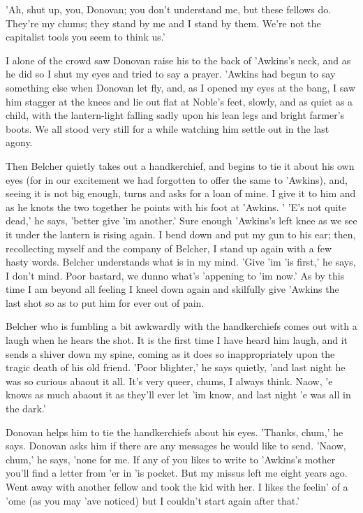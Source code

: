 \documentclass[10pt,a4paper]{article}
\newcommand{\glos}[3]{\dotuline{#1}\marginpar{\scriptsize\textit{#3} #2}}
\begin{document}
'Ah, shut up, you, Donovan; you don't understand me, but these fellows do. They're my chums; they stand by me and I stand by them. We're not the capitalist tools you seem to think us.' 

I alone of the crowd saw Donovan raise his \glos{Webley}{revolver mærke}{propr.} to the back of 'Awkins's neck, and as he did so I shut my eyes and tried to say a prayer. 'Awkins had begun to say something else when Donovan let fly, and, as I opened my eyes at the bang, I saw him stagger at the knees and lie out flat at Noble's feet, slowly, and as quiet as a child, with the lantern-light falling sadly upon his lean legs and bright farmer's boots. We all stood very still for a while watching him settle out in the last agony. 

Then Belcher quietly takes out a handkerchief, and begins to tie it about his own eyes (for in our excitement we had forgotten to offer the same to 'Awkins), and, seeing it is not big enough, turns and asks for a loan of mine. I give it to him and as he knots the two together he points with his foot at 'Awkins. ' 'E's not quite dead,' he says, 'better give 'im another.' Sure enough 'Awkins's left knee as we see it under the lantern is rising again. I bend down and put my gun to his ear; then, recollecting myself and the company of Belcher, I stand up again with a few hasty words. Belcher understands what is in my mind. 'Give 'im 'is first,' he says, I don't mind. Poor bastard, we dunno what's 'appening to 'im now.' As by this time I am beyond all feeling I kneel down again and skilfully give 'Awkins the last shot so as to put him for ever out of pain. 

Belcher who is fumbling a bit awkwardly with the handkerchiefs comes out with a laugh when he hears the shot. It is the first time I have heard him laugh, and it sends a shiver down my spine, coming as it does so inappropriately upon the tragic death of his old friend. 'Poor blighter,' he says quietly, 'and last night he was so curious abaout it all. It's very queer, chums, I always think. Naow, 'e knows as much abaout it as they'll ever let 'im know, and last night 'e was all in the dark.' 

Donovan helps him to tie the handkerchiefs about his eyes. 'Thanks, chum,' he says. Donovan asks him if there are any messages he would like to send. 'Naow, chum,' he says, 'none for me. If any of you likes to write to 'Awkins's mother you'll find a letter from 'er in 'is pocket. But my missus left me eight years ago. Went away with another fellow and took the kid with her. I likes the feelin' of a 'ome (as you may 'ave noticed) but I couldn't start again after that.' 
\end{document}
